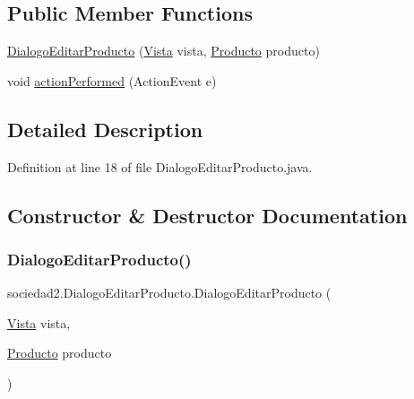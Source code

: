 \subsection*{Public Member Functions}
\begin{DoxyCompactItemize}
\item 
\mbox{\hyperlink{classsociedad2_1_1_dialogo_editar_producto_affb56a4ab94c03828395eeeb72ec9fda}{Dialogo\+Editar\+Producto}} (\mbox{\hyperlink{classsociedad2_1_1_vista}{Vista}} vista, \mbox{\hyperlink{classsociedad2_1_1_producto}{Producto}} producto)
\item 
void \mbox{\hyperlink{classsociedad2_1_1_dialogo_editar_producto_a98ba8d54ae5c25b8ef24e3f5acd41f27}{action\+Performed}} (Action\+Event e)
\end{DoxyCompactItemize}


\subsection{Detailed Description}


Definition at line 18 of file Dialogo\+Editar\+Producto.\+java.



\subsection{Constructor \& Destructor Documentation}
\mbox{\label{classsociedad2_1_1_dialogo_editar_producto_affb56a4ab94c03828395eeeb72ec9fda}} 
\subsubsection{\texorpdfstring{Dialogo\+Editar\+Producto()}{DialogoEditarProducto()}}
{\footnotesize\ttfamily sociedad2.\+Dialogo\+Editar\+Producto.\+Dialogo\+Editar\+Producto (\begin{DoxyParamCaption}\item[{\mbox{\hyperlink{classsociedad2_1_1_vista}{Vista}}}]{vista,  }\item[{\mbox{\hyperlink{classsociedad2_1_1_producto}{Producto}}}]{producto }\end{DoxyParamCaption})}




